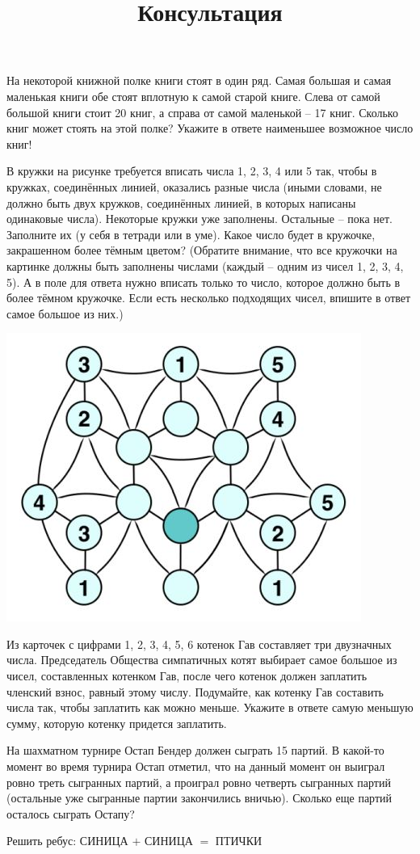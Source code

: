 \newpage
\title{Консультация}
\begin{listofex}
	\item На некоторой книжной полке книги стоят в один ряд. Самая большая и самая маленькая книги обе стоят вплотную к самой старой книге. Слева от самой большой
	книги стоит 20 книг, а справа от самой маленькой – 17 книг. Сколько книг может
	стоять на этой полке? Укажите в ответе наименьшее возможное число книг!
	\item В кружки на рисунке требуется вписать числа 1, 2, 3, 4 или 5 так, чтобы в кружках,
	соединённых линией, оказались разные числа (иными словами, не должно быть двух
	кружков, соединённых линией, в которых написаны одинаковые числа). Некоторые
	кружки уже заполнены. Остальные – пока нет. Заполните их (у себя в тетради или в
	уме). Какое число будет в кружочке, закрашенном более тёмным цветом? (Обратите
	внимание, что все кружочки на картинке должны быть заполнены числами (каждый
	– одним из чисел 1, 2, 3, 4, 5). А в поле для ответа нужно вписать только то число,
	которое должно быть в более тёмном кружочке. Если есть несколько подходящих
	чисел, впишите в ответ самое большое из них.)
	\begin{center}
		\includegraphics[width=0.5\linewidth]{123.jpg}
	\end{center}
	\item Из карточек с цифрами 1, 2, 3, 4, 5, 6 котенок Гав составляет три двузначных числа.
	Председатель Общества симпатичных котят выбирает самое большое из чисел, составленных котенком Гав, после чего котенок должен заплатить членский взнос, равный
	этому числу. Подумайте, как котенку Гав составить числа так, чтобы заплатить как
	можно меньше. Укажите в ответе самую меньшую сумму, которую котенку придется заплатить.
	\item На шахматном турнире Остап Бендер должен сыграть 15 партий. В какой-то момент во время турнира Остап отметил, что на данный момент он выиграл ровно треть
	сыгранных партий, а проиграл ровно четверть сыгранных партий (остальные уже сыгранные партии закончились вничью). Сколько еще партий осталось сыграть Остапу?
	\item Решить ребус: СИНИЦА \( + \) СИНИЦА \( = \) ПТИЧКИ
\end{listofex}